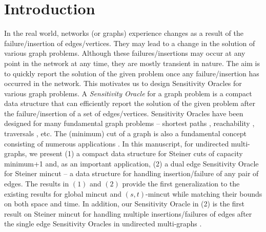 \documentclass[letterpaper,11pt]{article}
\begin{document}
\section{Introduction}
\label{sec : introduction}
 In the real world, networks (or graphs) experience changes as a result of the failure/insertion of edges/vertices. They may lead to a change in the solution of various graph problems. Although these failures/insertions may occur at any point in the network at any time, they are mostly transient in nature. The aim is to quickly report the solution of the given problem once any failure/insertion has occurred in the network. This motivates us to design Sensitivity Oracles for various graph problems. A \textit{Sensitivity Oracle} for a graph problem is a compact data structure that can efficiently report the solution of the given problem after the failure/insertion of a set of edges/vertices. Sensitivity Oracles have been designed for many fundamental graph problems -- shortest paths  \cite{DBLP:journals/talg/BaswanaCHR20, DBLP:conf/stoc/BiloCCC0KS23}, reachability  \cite{DBLP:conf/soda/ItalianoKP21, DBLP:conf/stoc/BaswanaCR16}, traversals \cite{DBLP:conf/podc/Parter15}, etc. 
The (minimum) cut of a graph is also a fundamental concept consisting of numerous applications \cite{DBLP:books/daglib/0069809}. In this manuscript, for undirected multi-graphs, we present (1) a compact data structure for Steiner cuts of capacity minimum+1 and, as an important application, (2) a dual edge Sensitivity Oracle for Steiner mincut -- a data structure for handling insertion/failure of any pair of edges. The results in $(1)$ and $(2)$ provide the first generalization to the existing results for global mincut \cite{DBLP:conf/stoc/DinitzN95} and $(s,t)$-mincut  \cite{DBLP:journals/talg/BaswanaBP23} while matching their bounds on both space and time. In addition, our Sensitivity Oracle in (2) is the first result on Steiner mincut for handling multiple insertions/failures of edges after the single edge Sensitivity Oracles in undirected multi-graphs \cite{DBLP:conf/soda/BaswanaP22, DBLP:conf/soda/DinitzV95, DBLP:conf/stoc/DinitzV94, DBLP:journals/siamcomp/DinitzV00}. 
\end{document}
